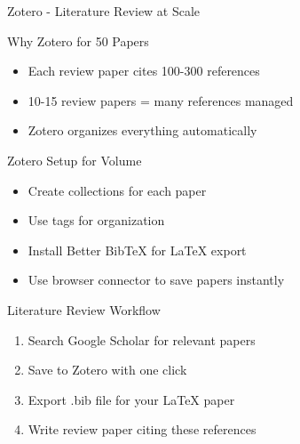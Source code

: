 \documentclass[11pt]{beamer}
\begin{document}
	\begin{frame}{Zotero - Literature Review at Scale}
		\scriptsize
		\begin{block}{Why Zotero for 50 Papers}
			\begin{itemize}
				\item Each review paper cites 100-300 references
				\item 10-15 review papers = many references managed
				\item Zotero organizes everything automatically
			\end{itemize}
		\end{block}
		\begin{block}{Zotero Setup for Volume}
			\begin{itemize}
				\item Create collections for each paper
				\item Use tags for organization
				\item Install Better BibTeX for LaTeX export
				\item Use browser connector to save papers instantly
			\end{itemize}
		\end{block}
		\begin{block}{Literature Review Workflow}
			\begin{enumerate}
				\item Search Google Scholar for relevant papers
				\item Save to Zotero with one click
				\item Export .bib file for your LaTeX paper
				\item Write review paper citing these references
			\end{enumerate}
		\end{block}
	\end{frame}
	
\end{document}
